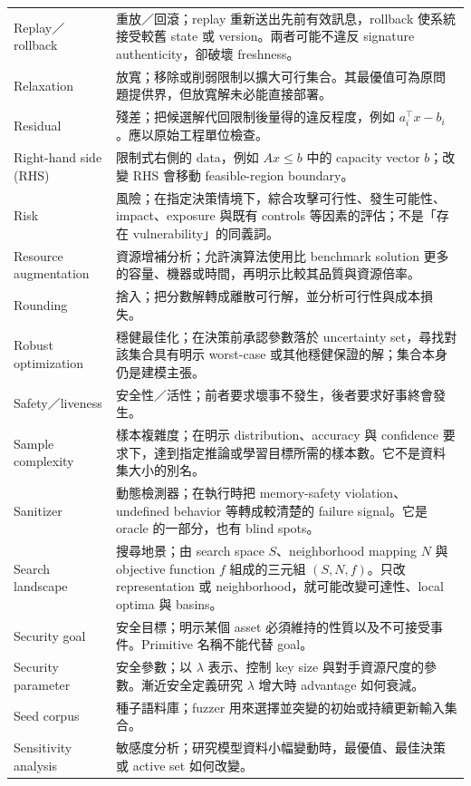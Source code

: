 \documentclass[11pt,a4paper,oneside,openany]{book}
\begin{document}
\begin{longtable}{@{}>{\raggedright\arraybackslash}p{}p{}@{}}
Replay／rollback & 重放／回滾；replay 重新送出先前有效訊息，rollback 使系統接受較舊 state 或 version。兩者可能不違反 signature authenticity，卻破壞 freshness。 \\
Relaxation & 放寬；移除或削弱限制以擴大可行集合。其最優值可為原問題提供界，但放寬解未必能直接部署。 \\
Residual & 殘差；把候選解代回限制後量得的違反程度，例如 $a_i^\top x-b_i$。應以原始工程單位檢查。 \\
Right-hand side (RHS) & 限制式右側的 data，例如 $Ax\le b$ 中的 capacity vector $b$；改變 RHS 會移動 feasible-region boundary。 \\
Risk & 風險；在指定決策情境下，綜合攻擊可行性、發生可能性、impact、exposure 與既有 controls 等因素的評估；不是「存在 vulnerability」的同義詞。 \\
Resource augmentation & 資源增補分析；允許演算法使用比 benchmark solution 更多的容量、機器或時間，再明示比較其品質與資源倍率。 \\
Rounding & 捨入；把分數解轉成離散可行解，並分析可行性與成本損失。 \\
Robust optimization & 穩健最佳化；在決策前承認參數落於 uncertainty set，尋找對該集合具有明示 worst-case 或其他穩健保證的解；集合本身仍是建模主張。 \\
Safety／liveness & 安全性／活性；前者要求壞事不發生，後者要求好事終會發生。 \\
Sample complexity & 樣本複雜度；在明示 distribution、accuracy 與 confidence 要求下，達到指定推論或學習目標所需的樣本數。它不是資料集大小的別名。 \\
Sanitizer & 動態檢測器；在執行時把 memory-safety violation、undefined behavior 等轉成較清楚的 failure signal。它是 oracle 的一部分，也有 blind spots。 \\
Search landscape & 搜尋地景；由 search space $S$、neighborhood mapping $N$ 與 objective function $f$ 組成的三元組 $(S,N,f)$。只改 representation 或 neighborhood，就可能改變可達性、local optima 與 basins。 \\
Security goal & 安全目標；明示某個 asset 必須維持的性質以及不可接受事件。Primitive 名稱不能代替 goal。 \\
Security parameter & 安全參數；以 $\lambda$ 表示、控制 key size 與對手資源尺度的參數。漸近安全定義研究 $\lambda$ 增大時 advantage 如何衰減。 \\
Seed corpus & 種子語料庫；fuzzer 用來選擇並突變的初始或持續更新輸入集合。 \\
Sensitivity analysis & 敏感度分析；研究模型資料小幅變動時，最優值、最佳決策或 active set 如何改變。 \\

\end{longtable}
\end{document}
